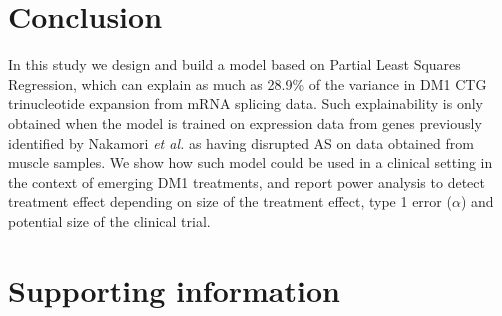 \documentclass[10pt,letterpaper]{article}
\newlength\savedwidth
\newcommand\thickhline{\noalign{\global\savedwidth\arrayrulewidth\global\arrayrulewidth 2pt}%
\hline
\noalign{\global\arrayrulewidth\savedwidth}}
\begin{document}

\section*{Conclusion}

In this study we design and build a model based on Partial Least Squares Regression, which can explain as much as 28.9\% of the variance in DM1 CTG trinucleotide expansion from mRNA splicing data. Such explainability is only obtained when the model is trained on expression data from genes previously identified by Nakamori {\it et al.} \cite{Nakamori2013} as having disrupted AS on data obtained from muscle samples. We show how such model could be used in a clinical setting in the context of emerging DM1 treatments, and report power analysis to detect treatment effect depending on size of the treatment effect, type 1 error ($\alpha$) and potential size of the clinical trial. 

\section*{Supporting information}
\end{document}
